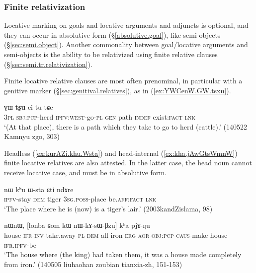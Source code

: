 \subsubsection{Finite relativization}  \label{sec:locative.relativization.finite}
Locative marking on goals and locative arguments and adjuncts is optional, and they can occur in absolutive form (§\ref{absolutive.goal}), like semi-objects (§\ref{sec:semi.object}). Another commonality between goal/locative arguments and semi-objects is the ability to be relativized using finite relative clauses (§\ref{sec:semi.tr.relativization}). 

Finite locative relative clauses are most often prenominal, in particular with a genitive marker (§\ref{sec:genitival.relatives}), as in (\ref{ex:YWCenW.GW.tsxu}).

\begin{exe}
\ex \label{ex:YWCenW.GW.tsxu}
 ɣɯ \textbf{tʂu} ci tu tɕe  \\
\textsc{3pl} \textsc{sbj}:\textsc{pcp}-herd \textsc{ipfv}:\textsc{west}-go-\textsc{pl} \textsc{gen} path \textsc{indef} exist:\textsc{fact} \textsc{lnk} \\
\glt `(At that place), there is a path which they take to go to herd (cattle).' (140522 Kamnyu zgo, 303)
\end{exe} 

Headless (\ref{ex:kurAZi.khu.Wsta}) and head-internal (\ref{ex:kha.jAwGtsWmnW}) finite locative relatives are also attested. In the latter case, the head noun cannot receive locative case, and must be in absolutive form.

\begin{exe}
\ex \label{ex:kurAZi.khu.Wsta}
\gll [ku-rɤʑi] nɯ kʰu ɯ-sta ɕti ndɤre \\
\textsc{ipfv}-stay \textsc{dem} tiger \textsc{3sg}.\textsc{poss}-place be.\textsc{aff}:\textsc{fact} \textsc{lnk} \\
\glt `The place where he is (now) is a tiger's lair.' (2003kandZislama, 98)
\end{exe} 

\begin{exe}
\ex \label{ex:kha.jAwGtsWmnW}
 nɯnɯ,  [lonba ɕom kɯ nɯ-kɤ-sɯ-βzu] kʰa pjɤ-ŋu \\
house \textsc{ifr}-\textsc{inv}-take.away-\textsc{pl} \textsc{dem} all iron \textsc{erg} \textsc{aor}-\textsc{obj}:\textsc{pcp}-\textsc{caus}-make house \textsc{ifr}.\textsc{ipfv}-be \\
\glt `The house where (the king) had taken them, it was a house made completely from iron.' (140505 liuhaohan zoubian tianxia-zh, 151-153)
\end{exe}

